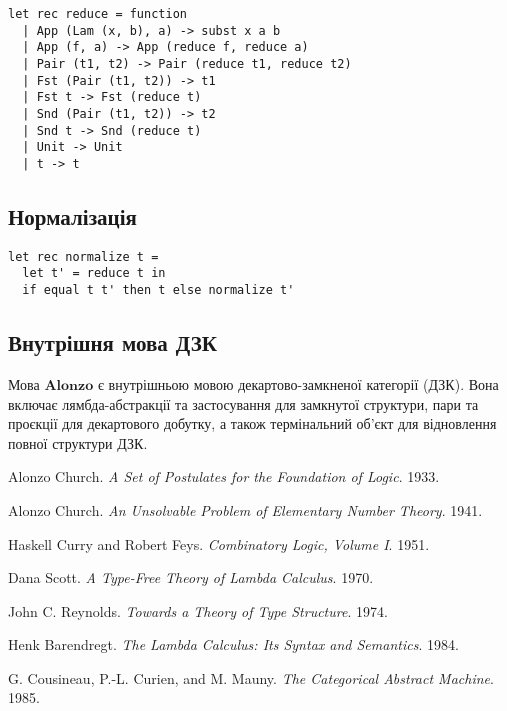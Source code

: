 \documentclass{article}
\begin{document}
\begin{lstlisting}[mathescape=true]
let rec reduce = function
  | App (Lam (x, b), a) -> subst x a b
  | App (f, a) -> App (reduce f, reduce a)
  | Pair (t1, t2) -> Pair (reduce t1, reduce t2)
  | Fst (Pair (t1, t2)) -> t1
  | Fst t -> Fst (reduce t)
  | Snd (Pair (t1, t2)) -> t2
  | Snd t -> Snd (reduce t)
  | Unit -> Unit
  | t -> t
\end{lstlisting}

\subsection{Нормалізація}

\begin{lstlisting}[mathescape=true]
let rec normalize t =
  let t' = reduce t in
  if equal t t' then t else normalize t'
\end{lstlisting}

\subsection{Внутрішня мова ДЗК}

Мова $\mathbf{Alonzo}$ є внутрішньою мовою декартово-замкненої категорії (ДЗК).
Вона включає лямбда-абстракції та застосування для замкнутої структури,
пари та проєкції для декартового добутку, а також термінальний об’єкт для
відновлення повної структури ДЗК.


\begin{thebibliography}{9}

Alonzo Church.
\textit{A Set of Postulates for the Foundation of Logic}.
1933.

Alonzo Church.
\textit{An Unsolvable Problem of Elementary Number Theory}.
1941.

Haskell Curry and Robert Feys.
\textit{Combinatory Logic, Volume I}.
1951.

Dana Scott.
\textit{A Type-Free Theory of Lambda Calculus}.
1970.

John C. Reynolds.
\textit{Towards a Theory of Type Structure}.
1974.

Henk Barendregt.
\textit{The Lambda Calculus: Its Syntax and Semantics}.
1984.

G. Cousineau, P.-L. Curien, and M. Mauny.
\textit{The Categorical Abstract Machine}.
1985.

\end{thebibliography}
\end{document}
